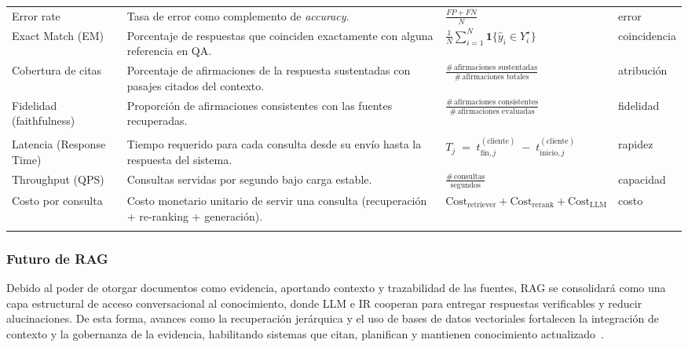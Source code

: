 \begin{tabularx}{\textwidth}{L{0.22\textwidth} Y C{0.30\textwidth} C{0.16\textwidth}}
    Error rate & Tasa de error como complemento de \textit{accuracy}. &
    $\displaystyle \frac{FP+FN}{N}$ & error \\[4pt]

    Exact Match (EM) & Porcentaje de respuestas que coinciden exactamente con alguna referencia en QA. &
    $\displaystyle \frac{1}{N}\sum_{i=1}^{N}\mathbf{1}\{\hat{y}_i\in Y_i^{\star}\}$ & coincidencia \\[4pt]

    Cobertura de citas & Porcentaje de afirmaciones de la respuesta sustentadas con pasajes citados del contexto. &
    $\displaystyle \frac{\#\,\text{afirmaciones sustentadas}}{\#\,\text{afirmaciones totales}}$ & atribución \\[4pt]

    Fidelidad (faithfulness) & Proporción de afirmaciones consistentes con las fuentes recuperadas. &
    $\displaystyle \frac{\#\,\text{afirmaciones consistentes}}{\#\,\text{afirmaciones evaluadas}}$ & fidelidad \\[4pt]

    \addlinespace[2pt]
    \\
    \cmidrule(lr){1-4}
    Latencia (Response Time) & Tiempo requerido para cada consulta desde su envío hasta la respuesta del sistema. &
    $\displaystyle T_j \;=\; t^{(\text{cliente})}_{\text{fin},j}\;-\;t^{(\text{cliente})}_{\text{inicio},j}$ & rapidez \\[4pt]

    Throughput (QPS) & Consultas servidas por segundo bajo carga estable. &
    $\displaystyle \frac{\#\,\text{consultas}}{\text{segundos}}$ & capacidad \\[4pt]

    Costo por consulta & Costo monetario unitario de servir una consulta (recuperación + re-ranking + generación). &
    $\displaystyle \mathrm{Cost}_{\text{retriever}}+\mathrm{Cost}_{\text{rerank}}+\mathrm{Cost}_{\text{LLM}}$ & costo \\[4pt]

    \bottomrule
    \caption{Métricas para evaluar sistemas RAG}
    \label{tab:metrics}
\end{tabularx}

\subsubsection{Futuro de RAG}

Debido al poder de otorgar documentos como evidencia, aportando contexto y trazabilidad de las fuentes, RAG se consolidará como una capa estructural de acceso conversacional
 al conocimiento, donde LLM e IR cooperan para entregar respuestas verificables y reducir alucinaciones. De esta forma, avances como la recuperación jerárquica y el uso de bases de datos vectoriales 
  fortalecen la integración de contexto y la gobernanza de la evidencia, habilitando sistemas que citan, planifican y mantienen 
 conocimiento actualizado~\parencite{zhai2024llmIR}. 


